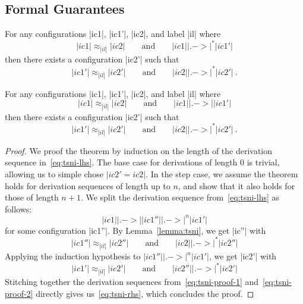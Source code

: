 \clearpage %
\subsection{Formal Guarantees}

\begin{theorem}
  For any configurations |ic1|, |ic1'|, |ic2|, and label |il| where
  \begin{equation} \label{eq:tsni-lhs}
    |ic1| \approx_{|il|} |ic2|
    \qquad \text{and} \qquad
    |ic1| |.->|^* |ic1'|
  \end{equation}
  then there exists a configuration |ic2'| such that
  \begin{equation} \label{eq:tsni-rhs}
    |ic1'| \approx_{|il|} |ic2'|
     \qquad \text{and} \qquad
    |ic2| |.->|^* |ic2'|
    \ \text{.}
  \end{equation}
\end{theorem}

\begin{lemma}
  \label{lemma:tsni}
  For any configurations |ic1|, |ic1'|, |ic2|, and label |il| where
  \begin{equation} \label{eq:tsni-lemma-lhs}
  |ic1| \approx_{|il|} |ic2|
  \qquad \text{and} \qquad
  |ic1| |.->| |ic1'|
  \end{equation}
  then there exists a configuration |ic2'| such that
  \begin{equation} \label{eq:tsni-lemma-rhs}
  |ic1'| \approx_{|il|} |ic2'|
  \qquad \text{and} \qquad
  |ic2| |.->|^* |ic2'|
  \ \text{.}
  \end{equation}
\end{lemma}

\begin{proof}
  We proof the theorem by induction on the length of the derivation sequence in~\eqref{eq:tsni-lhs}.
  The base case for derivations
  of length 0 is trivial, allowing
  us to simple chose $|ic2'=ic2|$.  In the step case, we assume
  the theorem holds for derivation sequences of length up to $n$, and show that it also
  holds for those of length $n+1$.  We split the derivation sequence from~\eqref{eq:tsni-lhs} as follows:
  \[
  |ic1| |.->| |ic1''| |.->|^n |ic1'|
  \]
  for some configuration |ic1''|.  By Lemma~\ref{lemma:tsni}, we get
  |ic''| with
  \begin{equation} \label{eq:tsni-proof-1}
  |ic1''| \approx_{|il|} |ic2''|
  \qquad \text{and} \qquad
  |ic2| |.->|^* |ic2''|
  \end{equation}
  Applying the induction hypothesis to
  $|ic1''| |.->|^n |ic1'|$, we get |ic2'| with
  \begin{equation} \label{eq:tsni-proof-2}
  |ic1'| \approx_{|il|} |ic2'|
  \qquad \text{and} \qquad
  |ic2''| |.->|^* |ic2'|
  \end{equation}
  Stitching together the derivation sequences from~\eqref{eq:tsni-proof-1} and~\eqref{eq:tsni-proof-2} directly gives
  us~\eqref{eq:tsni-rhs}, which concludes the proof.
\end{proof}

